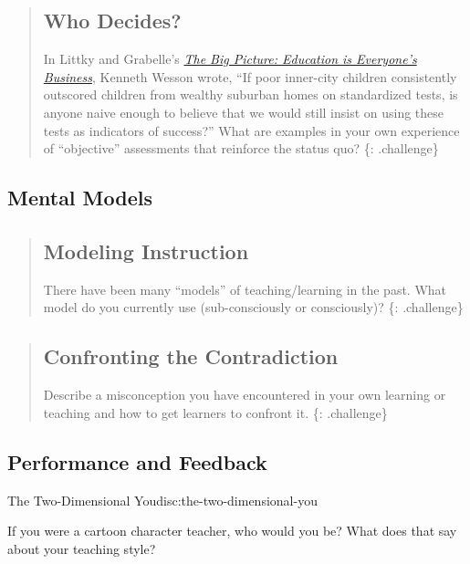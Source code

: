 \begin{quote}
\subsection{Who Decides?}\label{who-decides}

In Littky and Grabelle's
\emph{\href{http://www.amazon.com/Big-Picture-Education-Everyones-Business/dp/0871209713/}{The
Big Picture: Education is Everyone's Business}}, Kenneth Wesson wrote,
``If poor inner-city children consistently outscored children from
wealthy suburban homes on standardized tests, is anyone naive enough to
believe that we would still insist on using these tests as indicators of
success?'' What are examples in your own experience of ``objective''
assessments that reinforce the status quo? \{: .challenge\}
\end{quote}

\subsection{Mental Models}\label{mental-models}

\begin{quote}
\subsection{Modeling Instruction}\label{modeling-instruction}

There have been many ``models'' of teaching/learning in the past. What
model do you currently use (sub-consciously or consciously)? \{:
.challenge\}
\end{quote}

\begin{quote}
\subsection{Confronting the
Contradiction}\label{confronting-the-contradiction}

Describe a misconception you have encountered in your own learning or
teaching and how to get learners to confront it. \{: .challenge\}
\end{quote}

\subsection{Performance and Feedback}\label{performance-and-feedback}

\begin{discussion}{The Two-Dimensional You}{disc:the-two-dimensional-you}

If you were a cartoon character teacher, who would you be? What does
that say about your teaching style?
\end{discussion}

